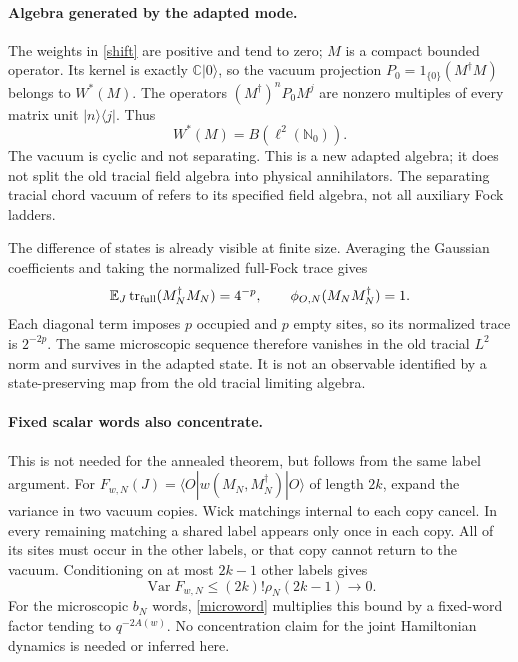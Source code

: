 \documentclass[11pt]{article}
\newcommand{\EE}{\mathbb E}
\newcommand{\tr}{\operatorname{tr}}
\begin{document}
\paragraph{Algebra generated by the adapted mode.}
The weights in \eqref{shift} are positive and tend to zero; $M$ is a
compact bounded operator. Its kernel is exactly $\mathbb C|0\rangle$,
so the vacuum projection $P_0=1_{\{0\}}(M^\dagger M)$ belongs to
$W^*(M)$. The operators $(M^\dagger)^nP_0M^j$ are nonzero multiples
of every matrix unit $|n\rangle\langle j|$. Thus
\begin{equation}
 W^*(M)=B(\ell^2(\mathbb N_0)).
\end{equation}
The vacuum is cyclic and not separating. This is a new adapted
algebra; it does not split the old tracial field algebra into physical
annihilators. The separating tracial chord vacuum of \cite{Xu} refers
to its specified field algebra, not all auxiliary Fock ladders.

The difference of states is already visible at finite size. Averaging
the Gaussian coefficients and taking the normalized full-Fock trace
gives
\begin{equation}\label{invisible}
 \EE_J\tr_{\rm full}(M_N^\dagger M_N)=4^{-p},\qquad
 \phi_{O,N}(M_NM_N^\dagger)=1.
\end{equation}
Each diagonal term imposes $p$ occupied and $p$ empty sites, so its
normalized trace is $2^{-2p}$. The same microscopic sequence therefore
vanishes in the old tracial $L^2$ norm and survives in the adapted
state. It is not an observable identified by a state-preserving map
from the old tracial limiting algebra.

\paragraph{Fixed scalar words also concentrate.}
This is not needed for the annealed theorem, but follows from the same
label argument. For $F_{w,N}(J)=\langle O|w(M_N,M_N^\dagger)|O\rangle$
of length $2k$, expand the variance in two vacuum copies. Wick
matchings internal to each copy cancel. In every remaining matching
a shared label appears only once in each copy. All of its sites
must occur in the other labels, or that copy cannot return to the
vacuum. Conditioning on at most $2k-1$ other labels gives
\begin{equation}
 \operatorname{Var}F_{w,N}\le (2k)!\rho_N(2k-1)\longrightarrow0.
\end{equation}
For the microscopic $b_N$ words, \eqref{microword} multiplies this
bound by a fixed-word factor tending to $q^{-2A(w)}$.
No concentration claim for the joint Hamiltonian dynamics is needed
or inferred here.
\end{document}
